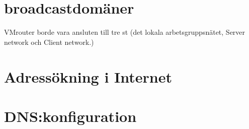 \documentclass[swedish,10pt,a4paper]{report}
\begin{document}
\chapter{broadcastdomäner}
\label{sec:broadcastdomains}

VMrouter borde vara ansluten till tre st (det lokala arbetsgruppsnätet, Server network och Client network.)

\chapter{Adressökning i Internet}\label{chap:adress_i_internet}



\chapter{DNS:konfiguration}
\label{sec:dns_konf}







\end{document}
